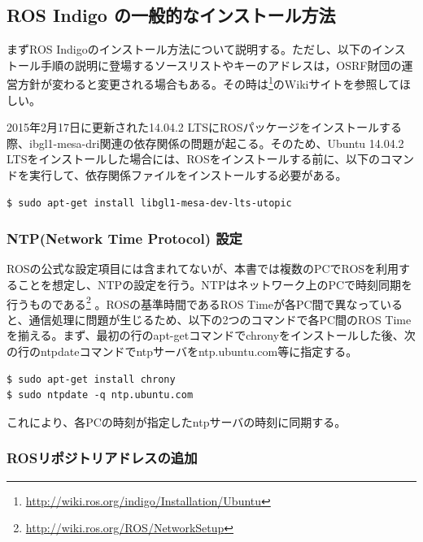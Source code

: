 \subsection{ROS Indigo の一般的なインストール方法}

まずROS Indigoのインストール方法について説明する。ただし、以下のインストール手順の説明に登場するソースリストやキーのアドレスは，OSRF財団の運営方針が変わると変更される場合もある。その時は\footnote{\url{http://wiki.ros.org/indigo/Installation/Ubuntu}}のWikiサイトを参照してほしい。

\begin{exercise}
  2015年2月17日に更新された14.04.2 LTSにROSパッケージをインストールする際、ibgl1-mesa-dri関連の依存関係の問題が起こる。そのため、Ubuntu 14.04.2 LTSをインストールした場合には、ROSをインストールする前に、以下のコマンドを実行して、依存関係ファイルをインストールする必要がある。
  \begin{lstlisting}[language=ROS]
  $ sudo apt-get install libgl1-mesa-dev-lts-utopic
  \end{lstlisting}
\end{exercise}

\subsubsection{NTP(Network Time Protocol) 設定}
ROSの公式な設定項目には含まれてないが、本書では複数のPCでROSを利用することを想定し、NTPの設定を行う。NTPはネットワーク上のPCで時刻同期を行うものである\footnote{\url{http://wiki.ros.org/ROS/NetworkSetup}} 。ROSの基準時間であるROS Timeが各PC間で異なっていると、通信処理に問題が生じるため、以下の2つのコマンドで各PC間のROS Timeを揃える。まず、最初の行のapt-getコマンドでchronyをインストールした後、次の行のntpdateコマンドでntpサーバをntp.ubuntu.com等に指定する。

\begin{lstlisting}[language=ROS]
$ sudo apt-get install chrony
$ sudo ntpdate -q ntp.ubuntu.com
\end{lstlisting}

これにより、各PCの時刻が指定したntpサーバの時刻に同期する。

\subsubsection{ROSリポジトリアドレスの追加}

